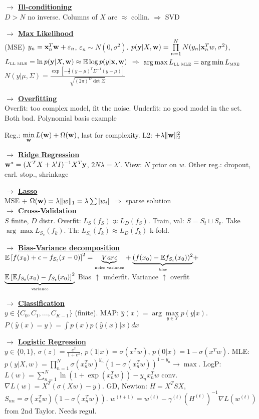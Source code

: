 \documentclass[11pt]{article}
\newcommand{\myvector}[1]{{\bf{#1}}}
\newcommand{\x}{\myvector{x}}
\newcommand{\y}{\myvector{y}}
\newcommand{\w}{\myvector{w}}
\newcommand{\underlabel}[2]{\underset{\mbox{\tiny #2}}{\underbrace{#1}}}
\newcommand{\mytitle}[1]{ {\bf $\rightarrow$ \underline{#1}}\\}
\begin{document}
\begin{multicols*}{2}
\mytitle{Ill-conditioning}
$D>N$ no inverse. Columns of $X$ are $\approx$ collin. $\Rightarrow$ SVD

\mytitle{Max Likelihood}
(MSE) $y_n=\x_n^T\w+\varepsilon_n$, $\varepsilon_n\sim N(0, \sigma^2)$. $p(\y|X,\w)=\prod\limits_{n=1}^NN(y_n|\x_n^Tw,\sigma^2)$, $L_{\mbox{\tiny LL MLE}}=\ln p(\y|X,\w)\approx \mathbb{E}\log p(y|\x,\w)$ $\Rightarrow$ $\arg\max L_{\mbox{\tiny LL MLE}}=\arg\min L_{\mbox{\tiny MSE}}$\\
$N(y|\mu,\Sigma)=\frac{\exp\left[-\frac{1}{2}(y-\mu)^T\Sigma^{-1}(y-\mu)\right]}{\sqrt{(2\pi)^D\det\Sigma}}$

\mytitle{Overfitting}
Overfit: too complex model, fit the noise.
Underfit: no good model in the set.
Both bad. Polynomial basis example

Reg.: $\min\limits_\w L(\w)+\Omega(\w)$, last for complexity.
L2: $+\lambda \|\w\|_2^2$

\mytitle{Ridge Regression}
$\w^*=(X^TX+\lambda'I)^{-1}X^T\y$, $2N\lambda=\lambda'$.
View: $N$ prior on $w$.
Other reg.: dropout, earl. stop., shrinkage

\mytitle{Lasso}
MSE + $\Omega(\w)=\lambda \|w\|_1=\lambda\sum |w_i|$ $\Rightarrow$ sparse solution\\

\mytitle{Cross-Validation}
$S$ finite, $D$ distr.
Overfit: $L_S(f_S)\not\approx L_D(f_S)$.
Train, val: $S=S_t\sqcup S_v$.
Take $\arg\max L_{S_v}(f_k)$.
Th: $L_{S_v}(f_k)\approx L_D(f_k)$
k-fold.

\mytitle{Bias-Variance decomposition}
$\mathbb{E}\left[f(x_0)+\epsilon-f_{S_t}(x-0)\right]^2=\underlabel{Var\epsilon}{noise variance}+\underlabel{(f(x_0)-\mathbb{E}f_{S_t}(x_0))^2}{bias}+$\\
$\underlabel{\mathbb{E}\left[\mathbb{E}f_{S_t}(x_0)-f_{S_t}(x_0)\right]^2}{variance}$
Bias $\uparrow$ underfit.
Variance $\uparrow$ overfit

\mytitle{Classification}
$y\in \{C_0,C_1,...,C_{K-1}\}$ (finite).
MAP: $\hat{y}(x)=\arg\max\limits_{y\in Y}p(y|x)$.
$P(\hat{y}(x)=y)=\int p(x)p(\hat{y}(x)|x)dx$


\mytitle{Logistic Regression}
$y\in\{0,1\}$, $\sigma(z)=\frac{e^z}{1+e^z}$, $p(1|x)=\sigma(x^Tw)$, $p(0|x)=1-\sigma(x^Tw)$.
MLE: $p(y|X,w)=\prod\limits_{n=1}^N\sigma(x_n^Tw)^{y_n}\left(1-\sigma(x_n^Tw)\right)^{1-y_n}\to\max$.
LogP: $L(w)=\sum\limits_{n=1}^N\ln(1+\exp(x_n^Tw))-y_nx_n^Tw$ conv.
$\nabla L(w)=X^T(\sigma(Xw)-y)$.
GD, Newton: $H=X^TSX$, $S_{nn}=\sigma(x_n^Tw)(1-\sigma(x_n^Tw))$.
$w^{(t+1)}=w^{(t)}-\gamma^{(t)}(H^{(t)})^{-1}\nabla L(w^{(t)})$ from 2nd Taylor.
Needs regul.


\end{multicols*}
\end{document}
